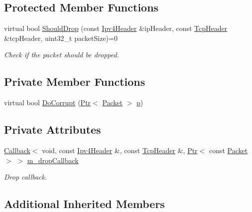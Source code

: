 \subsection*{Protected Member Functions}
\begin{DoxyCompactItemize}
\item 
virtual bool \hyperlink{classns3_1_1TcpGeneralErrorModel_aba3c6551e43eabb1ac165b2dc7d491c9}{Should\+Drop} (const \hyperlink{classns3_1_1Ipv4Header}{Ipv4\+Header} \&ip\+Header, const \hyperlink{classns3_1_1TcpHeader}{Tcp\+Header} \&tcp\+Header, uint32\+\_\+t packet\+Size)=0
\begin{DoxyCompactList}\small\item\em Check if the packet should be dropped. \end{DoxyCompactList}\end{DoxyCompactItemize}
\subsection*{Private Member Functions}
\begin{DoxyCompactItemize}
\item 
virtual bool \hyperlink{classns3_1_1TcpGeneralErrorModel_a45cf0b37801164078eb0643dfe388468}{Do\+Corrupt} (\hyperlink{classns3_1_1Ptr}{Ptr}$<$ \hyperlink{classns3_1_1Packet}{Packet} $>$ \hyperlink{lte__link__budget__x2__handover__measures_8m_ac9de518908a968428863f829398a4e62}{p})
\end{DoxyCompactItemize}
\subsection*{Private Attributes}
\begin{DoxyCompactItemize}
\item 
\hyperlink{classns3_1_1Callback}{Callback}$<$ void, const \hyperlink{classns3_1_1Ipv4Header}{Ipv4\+Header} \&, const \hyperlink{classns3_1_1TcpHeader}{Tcp\+Header} \&, \hyperlink{classns3_1_1Ptr}{Ptr}$<$ const \hyperlink{classns3_1_1Packet}{Packet} $>$ $>$ \hyperlink{classns3_1_1TcpGeneralErrorModel_a8c608cfd9642b92571b8b4cc771bd55f}{m\+\_\+drop\+Callback}
\begin{DoxyCompactList}\small\item\em Drop callback. \end{DoxyCompactList}\end{DoxyCompactItemize}
\subsection*{Additional Inherited Members}


